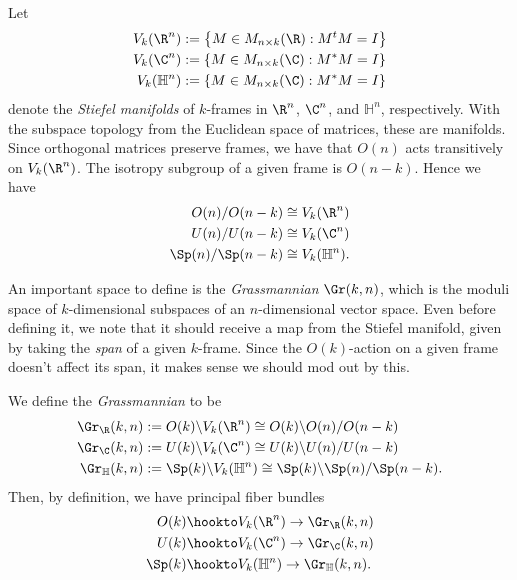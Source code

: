 \documentclass[11pt]{amsart}
\begin{document}
\begin{example} Let
\begin{align*}
    V_k(\R^n) & := \left\{ M \in M_{n \times k}(\R) : M^t M = I \right\} \\
    V_k(\C^n) & := \left\{ M \in M_{n \times k}(\C) : M^\ast M = I \right\} \\
    V_k(\mathbb{H}^n) & := \left\{ M \in M_{n \times k}(\C) : M^\ast M = I \right\}
\end{align*}
denote the \emph{Stiefel manifolds} of $k$-frames in $\R^n$,  $\C^n$, and $\mathbb{H}^n$, respectively. With the subspace topology from the Euclidean space of matrices, these are manifolds. Since orthogonal matrices preserve frames, we have that $O(n)$ acts transitively on $V_k(\R^n)$. The isotropy subgroup of a given frame is $O(n-k)$. Hence we have
\begin{align*}
    O(n)/O(n-k) &\cong V_k(\R^n) \\
    U(n)/U(n-k) &\cong V_k(\C^n) \\
    \Sp(n)/\Sp(n-k) &\cong V_k(\mathbb{H}^n).
\end{align*}
\end{example}

An important space to define is the \emph{Grassmannian} $\Gr(k,n)$, which is the moduli space of $k$-dimensional subspaces of an $n$-dimensional vector space. Even before defining it, we note that it should receive a map from the Stiefel manifold, given by taking the \emph{span} of a given $k$-frame. Since the $O(k)$-action on a given frame doesn't affect its span, it makes sense we should mod out by this.

\begin{definition}\label{def:Grassmannian}
We define the \emph{Grassmannian} to be
\begin{align*}
    \Gr_\R(k,n) & := O(k)\backslash V_k(\R^n) \cong O(k)\backslash O(n)/O(n-k) \\
    \Gr_\C(k,n) & := U(k) \backslash V_k(\C^n) \cong U(k) \backslash U(n)/U(n-k) \\
    \Gr_{\mathbb{H}}(k,n) & := \Sp(k) \backslash V_k(\mathbb{H}^n) \cong \Sp(k)\backslash \Sp(n)/\Sp(n-k).
\end{align*}
Then, by definition, we have principal fiber bundles
\begin{align*}
    O(k) \hookto & V_k(\R^n) \to \Gr_\R(k,n) \\
    U(k) \hookto & V_k(\C^n) \to \Gr_\C(k,n) \\
    \Sp(k) \hookto & V_k(\mathbb{H}^n) \to \Gr_{\mathbb{H}}(k,n).
\end{align*}
\end{definition}
\end{document}
